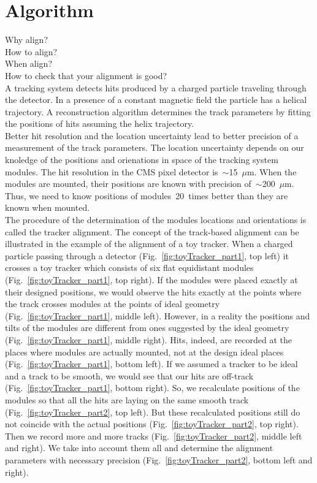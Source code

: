 \section{Algorithm}
\label{sec:alignmentAlg}

Why align?\\
How to align?\\
When align?\\
How to check that your alignment is good?\\

A tracking system detects hits produced by a charged particle traveling through the detector. In a presence of a constant magnetic field the particle has a helical trajectory. A reconstruction algorithm determines the track parameters by fitting the positions of hits assuming the helix trajectory.\\

Better hit resolution and the location uncertainty lead to better precision of a measurement of the track parameters. The location uncertainty depends on our knoledge of the positions and orienations in space of the tracking system modules. The hit resolution in the CMS pixel detector is~$\sim$15~$\mu$m. When the modules are mounted, their positions are known with precision of~$\sim$200~$\mu$m. Thus, we need to know positions of modules~20~times better than they are known when mounted.\\  

The procedure of the determination of the modules locations and orientations is called the tracker alignment. The concept of the track-based alignment can be illustrated in the example of the alignment of a toy tracker. When a charged particle passing through a detector (Fig.~\ref{fig:toyTracker_part1}, top left) it crosses a toy tracker which consists of six flat equidistant modules (Fig.~\ref{fig:toyTracker_part1}, top right). If the modules were placed exactly at their designed positions, we would observe the hits exactly at the points where the track crosses modules at the points of ideal geometry (Fig.~\ref{fig:toyTracker_part1}, middle left). However, in a reality the positions and tilts of the modules are different from ones suggested by the ideal geometry (Fig.~\ref{fig:toyTracker_part1}, middle right). Hits, indeed, are recorded at the places where modules are actually mounted, not at the design ideal places (Fig.~\ref{fig:toyTracker_part1}, bottom left). If we assumed a tracker to be ideal and a track to be smooth, we would see that our hits are off-track (Fig.~\ref{fig:toyTracker_part1}, bottom right). So, we recalculate positions of the modules so that all the hits are laying on the same smooth track (Fig.~\ref{fig:toyTracker_part2}, top left). But these recalculated positions still do not coincide with the actual positions (Fig.~\ref{fig:toyTracker_part2}, top right). Then we record more and more tracks (Fig.~\ref{fig:toyTracker_part2}, middle left and right). We take into account them all and determine the alignment parameters with necessary precision (Fig.~\ref{fig:toyTracker_part2}, bottom left and right).\\


